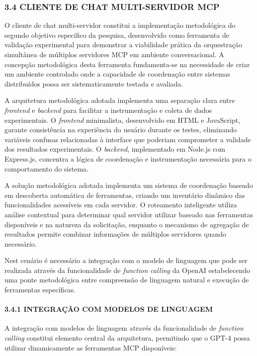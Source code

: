 \documentclass[
]{article}
\begin{document}
\subsubsection{3.4 CLIENTE DE CHAT MULTI-SERVIDOR
MCP}\label{cliente-de-chat-multi-servidor-mcp}

O cliente de chat multi-servidor constitui a implementação metodológica
do segundo objetivo específico da pesquisa, desenvolvido como ferramenta
de validação experimental para demonstrar a viabilidade prática da
orquestração simultânea de múltiplos servidores MCP em ambiente
conversacional. A concepção metodológica desta ferramenta fundamenta-se
na necessidade de criar um ambiente controlado onde a capacidade de
coordenação entre sistemas distribuídos possa ser sistematicamente
testada e avaliada.

A arquitetura metodológica adotada implementa uma separação clara entre
\emph{frontend} e \emph{backend} para facilitar a instrumentação e
coleta de dados experimentais. O \emph{frontend} minimalista,
desenvolvido em HTML e JavaScript, garante consistência na experiência
do usuário durante os testes, eliminando variáveis confusas relacionadas
à interface que poderiam comprometer a validade dos resultados
experimentais. O \emph{backend}, implementado em Node.js com Express.js,
concentra a lógica de coordenação e instrumentação necessária para o
comportamento do sistema.

A solução metodológica adotada implementa um sistema de coordenação
baseado em descoberta automática de ferramentas, criando um inventário
dinâmico das funcionalidades acessíveis em cada servidor. O roteamento
inteligente utiliza análise contextual para determinar qual servidor
utilizar baseado nas ferramentas disponíveis e na natureza da
solicitação, enquanto o mecanismo de agregação de resultados permite
combinar informações de múltiplos servidores quando necessário.

Nest cenário é necessário a integração com o modelo de linguagem que
pode ser realizada através da funcionalidade de \emph{function calling}
da OpenAI estabelecendo uma ponte metodológica entre compreensão de
linguagem natural e execução de ferramentas específicas.

\paragraph{3.4.1 INTEGRAÇÃO COM MODELOS DE
LINGUAGEM}\label{integrauxe7uxe3o-com-modelos-de-linguagem}

A integração com modelos de linguagem através da funcionalidade de
\emph{function calling} constitui elemento central da arquitetura,
permitindo que o GPT-4 possa utilizar dinamicamente as ferramentas MCP
disponíveis:
\end{document}

